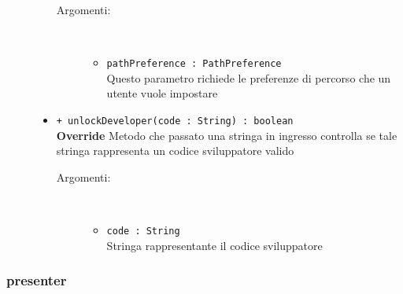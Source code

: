 \documentclass[../DefinizioneDiProdotto.tex]{subfiles}
\begin{document}
\begin{description}
\begin{itemize}
		\begin{description}
			\item[Argomenti:] \
			\begin{itemize}
				\item \texttt{pathPreference : PathPreference}\\
				Questo parametro richiede le preferenze di percorso che un utente vuole impostare\end{itemize}
		\end{description}
		\item \texttt{+ unlockDeveloper(code : String) : boolean}\\
		\textbf{Override} Metodo che passato una stringa in ingresso controlla se tale stringa rappresenta un codice sviluppatore valido
		\begin{description}
			\item[Argomenti:] \
			\begin{itemize}
				\item \texttt{code : String}\\
				Stringa rappresentante il codice sviluppatore\end{itemize}
		\end{description}
	\end{itemize}
\end{description}
\subsubsection{presenter}
\end{document}
